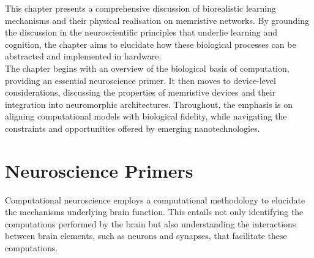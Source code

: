 \noindent This chapter presents a comprehensive discussion of biorealistic learning mechanisms and their physical realisation on memristive networks. By grounding the discussion in the neuroscientific principles that underlie learning and cognition, the chapter aims to elucidate how these biological processes can be abstracted and implemented in hardware. \\

\noindent The chapter begins with an overview of the biological basis of computation, providing an essential neuroscience primer. It then moves to device-level considerations, discussing the properties of memristive devices and their integration into neuromorphic architectures. Throughout, the emphasis is on aligning computational models with biological fidelity, while navigating the constraints and opportunities offered by emerging nanotechnologies.

\section[Neuroscience Primers]{Neuroscience Primers}

\noindent Computational neuroscience employs a computational methodology to elucidate the mechanisms underlying brain function. This entails not only identifying the computations performed by the brain but also understanding the interactions between brain elements, such as neurons and synapses, that facilitate these computations.\\




